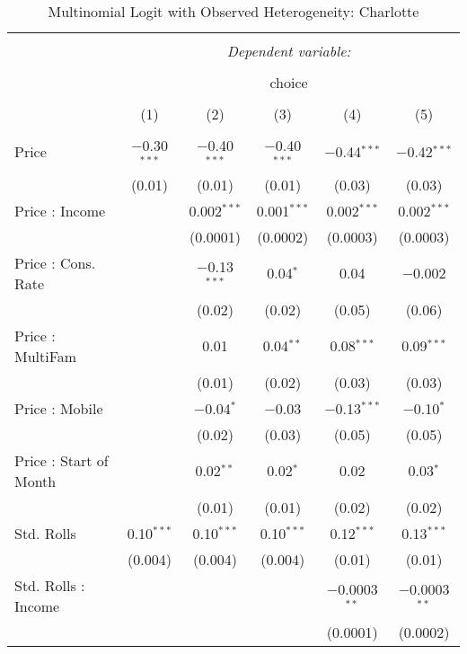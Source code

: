 
\begin{table}[!htbp] \centering 
  \caption{Multinomial Logit with Observed Heterogeneity: Charlotte} 
  \label{tab:mnlCharlotteObsHet} 
\begin{tabular}{@{\extracolsep{5pt}}lccccc} 
\\[-1.8ex]\hline 
\hline \\[-1.8ex] 
 & \multicolumn{5}{c}{\textit{Dependent variable:}} \\ 
\cline{2-6} 
\\[-1.8ex] & \multicolumn{5}{c}{choice} \\ 
\\[-1.8ex] & (1) & (2) & (3) & (4) & (5)\\ 
\hline \\[-1.8ex] 
 Price & $-$0.30$^{***}$ & $-$0.40$^{***}$ & $-$0.40$^{***}$ & $-$0.44$^{***}$ & $-$0.42$^{***}$ \\ 
  & (0.01) & (0.01) & (0.01) & (0.03) & (0.03) \\ 
  Price : Income &  & 0.002$^{***}$ & 0.001$^{***}$ & 0.002$^{***}$ & 0.002$^{***}$ \\ 
  &  & (0.0001) & (0.0002) & (0.0003) & (0.0003) \\ 
  Price : Cons. Rate &  & $-$0.13$^{***}$ & 0.04$^{*}$ & 0.04 & $-$0.002 \\ 
  &  & (0.02) & (0.02) & (0.05) & (0.06) \\ 
  Price : MultiFam &  & 0.01 & 0.04$^{**}$ & 0.08$^{***}$ & 0.09$^{***}$ \\ 
  &  & (0.01) & (0.02) & (0.03) & (0.03) \\ 
  Price : Mobile &  & $-$0.04$^{*}$ & $-$0.03 & $-$0.13$^{***}$ & $-$0.10$^{*}$ \\ 
  &  & (0.02) & (0.03) & (0.05) & (0.05) \\ 
  Price : Start of Month &  & 0.02$^{**}$ & 0.02$^{*}$ & 0.02 & 0.03$^{*}$ \\ 
  &  & (0.01) & (0.01) & (0.02) & (0.02) \\ 
  Std. Rolls & 0.10$^{***}$ & 0.10$^{***}$ & 0.10$^{***}$ & 0.12$^{***}$ & 0.13$^{***}$ \\ 
  & (0.004) & (0.004) & (0.004) & (0.01) & (0.01) \\ 
  Std. Rolls : Income &  &  &  & $-$0.0003$^{**}$ & $-$0.0003$^{**}$ \\ 
  &  &  &  & (0.0001) & (0.0002) \\ 

\end{tabular}
\end{table}
